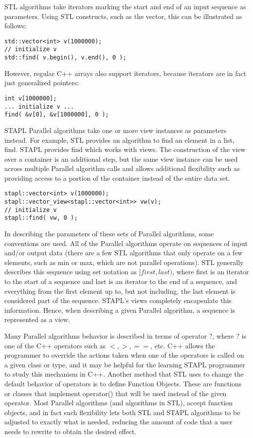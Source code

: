 STL algorithms take iterators marking the start and end of an input sequence as parameters. Using STL constructs, such as the vector, this can be illustrated as follows:

\begin{verbatim}
std::vector<int> v(1000000);
// initialize v
std::find( v.begin(), v.end(), 0 );
\end{verbatim}

However, regular C++ arrays also support iterators, because iterators are in fact just generalized pointers:

\begin{verbatim}
int v[1000000];
... initialize v ...
find( &v[0], &v[1000000], 0 );
\end{verbatim}

STAPL Parallel algorithms take one or more view instances as parameters instead. For example, STL provides an algorithm to find an element in a list, find. STAPL provides find which works with views. The construction of the view over a container is an additional step, but the same view instance can be used across multiple Parallel algorithm calls and allows additional flexibility such as providing access to a portion of the container instead of the entire data set.

\begin{verbatim}
stapl::vector<int> v(1000000);
stapl::vector_view<stapl::vector<int>> vw(v);
// initialize v
stapl::find( vw, 0 );
\end{verbatim}

In describing the parameters of these sets of Parallel algorithms, some conventions are used. All of the Parallel algorithms operate on sequences of input and/or output data (there are a few STL algorithms that only operate on a few elements, such as min or max, which are not parallel operations). STL generally describes this sequence using set notation as $[first, last)$, where first is an iterator to the start of a sequence and last is an iterator to the end of a sequence, and everything from the first element up to, but not including, the last element is considered part of the sequence. STAPL's views completely encapsulate this information. Hence, when describing a given Parallel algorithm, a sequence is represented as a view.

Many Parallel algorithms behavior is described in terms of operator $?$, where $?$ is one of the C++ operators such as $<, >, ==$, etc. C++ allows the programmer to override the actions taken when one of the operators is called on a given class or type, and it may be helpful for the learning STAPL programmer to study this mechanism in C++. Another method that STL uses to change the default behavior of operators is to define Function Objects. These are functions or classes that implement operator() that will be used instead of the given operator. Most Parallel algorithms (and algorithms in STL), accept function objects, and in fact such flexibility lets both STL and STAPL algorithms to be adjusted to exactly what is needed, reducing the amount of code that a user needs to rewrite to obtain the desired effect.

